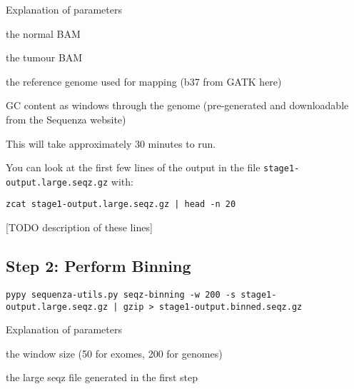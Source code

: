 \begin{note}
Explanation of parameters
\begin{description}[style=multiline,labelindent=0cm,align=right,leftmargin=\descriptionlabelspace,rightmargin=1.5cm,font=\ttfamily]
 \item[-n] the normal BAM
 \item[-t] the tumour BAM
 \item[--fasta] the reference genome used for mapping (b37 from GATK here)
 \item[-gc] GC content as windows through the genome (pre-generated and downloadable from the Sequenza website)
\end{description}
\end{note}

This will take approximately 30 minutes to run.

\begin{information}
You can look at the first few lines of the output in the file \texttt{stage1-output.large.seqz.gz} with:
 
\begin{lstlisting}
zcat stage1-output.large.seqz.gz | head -n 20
\end{lstlisting}
\end{information}

[TODO description of these lines]


\subsection{Step 2: Perform Binning}

\begin{steps}
\begin{lstlisting}
pypy sequenza-utils.py seqz-binning -w 200 -s stage1-output.large.seqz.gz | gzip > stage1-output.binned.seqz.gz
\end{lstlisting}
\end{steps}

\begin{note}
Explanation of parameters
\begin{description}[style=multiline,labelindent=0cm,align=right,leftmargin=\descriptionlabelspace,rightmargin=1.5cm,font=\ttfamily]
 \item[-w] the window size (50 for exomes, 200 for genomes)
 \item[-s] the large seqz file generated in the first step
\end{description}
\end{note}

